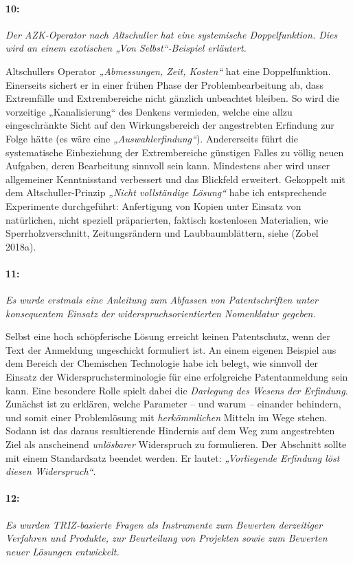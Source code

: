 \documentclass[12pt,a4paper]{article}
\newcommand{\these}[2]{\paragraph{#1:} \emph{#2}\par}
\begin{document}
\these{10}{Der AZK-Operator nach Altschuller hat eine systemische
  Doppelfunktion.  Dies wird an einem exotischen „Von Selbst“-Beispiel
  erläutert.}

Altschullers Operator \emph{„Abmessungen, Zeit, Kosten“} hat eine
Doppelfunktion.  Einerseits sichert er in einer frühen Phase der
Problembearbeitung ab, dass Extremfälle und Extrembereiche nicht gänzlich
unbeachtet bleiben. So wird die vorzeitige „Kanalisierung“ des Denkens
vermieden, welche eine allzu eingeschränkte Sicht auf den Wirkungsbereich der
angestrebten Erfindung zur Folge hätte (es wäre eine
\emph{„Auswahlerfindung“}).  Andererseits führt die systematische Einbeziehung
der Extrembereiche günstigen Falles zu völlig neuen Aufgaben, deren
Bearbeitung sinnvoll sein kann. Mindestens aber wird unser allgemeiner
Kenntnisstand verbessert und das Blickfeld erweitert.  Gekoppelt mit dem
Altschuller-Prinzip \emph{„Nicht vollständige Lösung“} habe ich entsprechende
Experimente durchgeführt: Anfertigung von Kopien unter Einsatz von
natürlichen, nicht speziell präparierten, faktisch kostenlosen Materialien,
wie Sperrholzverschnitt, Zeitungsrändern und Laubbaumblättern, siehe (Zobel
2018a).

\these{11}{Es wurde erstmals eine Anleitung zum Abfassen von Patentschriften
  unter konsequentem Einsatz der widerspruchsorientierten Nomenklatur
  gegeben.}

Selbst eine hoch schöpferische Lösung erreicht keinen Patentschutz, wenn der
Text der Anmeldung ungeschickt formuliert ist. An einem eigenen Beispiel aus
dem Bereich der Chemischen Technologie habe ich belegt, wie sinnvoll der
Einsatz der Widerspruchsterminologie für eine erfolgreiche Patentanmeldung
sein kann. Eine besondere Rolle spielt dabei die \emph{Darlegung des Wesens
  der Erfindung}. Zunächst ist zu erklären, welche Parameter – und warum –
einander behindern, und somit einer Problemlösung mit \emph{herkömmlichen}
Mitteln im Wege stehen. Sodann ist das daraus resultierende Hindernis auf dem
Weg zum angestrebten Ziel als anscheinend \emph{unlösbarer} Widerspruch zu
formulieren. Der Abschnitt sollte mit einem Standardsatz beendet werden. Er
lautet: \emph{„Vorliegende Erfindung löst diesen Widerspruch“}.

\these{12}{Es wurden TRIZ-basierte Fragen als Instrumente zum Bewerten
  derzeitiger Verfahren und Produkte, zur Beurteilung von Projekten sowie zum
  Bewerten neuer Lösungen entwickelt.}
\end{document}
